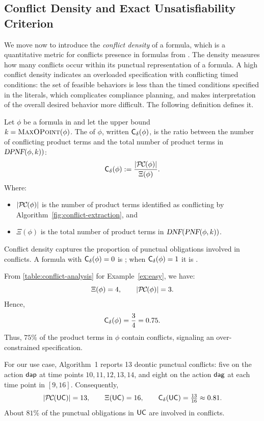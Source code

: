 \subsection{Conflict Density and Exact Unsatisfiability Criterion}
We move now to introduce the \emph{conflict density} of a formula, which is a quantitative metric for conflicts presence in formulas from \TDDLfm.  
The density measures how many conflicts occur within its punctual representation of a formula.  
A high conflict density indicates an overloaded specification with conflicting timed conditions: the set of feasible behaviors is less than the timed conditions specified in the literals, which complicates compliance planning, and makes interpretation of the overall desired behavior more difficult. The following definition defines it.

\begin{definition}\label{def:Conflict density-measure}
Let $\phi$ be a formula in \TDDLfm and let the upper bound\\ $k=\textsc{MaxOPoint}(\phi)$.  
The  of $\phi$, written $\mathsf{C_\delta} (\phi)$, is the ratio between the number of conflicting product terms and the total number of product terms in $\textsl{DPNF}(\phi,k))$:
\[
\cd(\phi) := \frac{\size{\mathcall{PC}(\phi)}}{\Xi(\phi)}.
\]
Where:
\begin{itemize}
    \item $\size{\mathcall{PC}(\phi)}$ is the number of product terms identified as conflicting by Algorithm~\ref{fig:conflict-extraction}, and
    \item $\Xi(\phi)$ is the total number of product terms in $\textsl{DNF}(\textsl{PNF}(\phi,k))$.
\end{itemize}
\end{definition}

Conflict density captures the proportion of punctual obligations involved in conflicts.  
A formula with $\mathsf{C_\delta} (\phi)=0$ is ; when $\mathsf{C_\delta} (\phi)=1$ it is .

\begin{example}
From \ref{table:conflict-analysis} for Example~\ref{ex:easy}, we have:
\[
\Xi(\phi)=4, \qquad \size{\mathcall{PC}(\phi)}=3.
\]
Hence,
\[
\mathsf{C_\delta} (\phi)=\frac{3}{4}=0.75.
\]
Thus, $75\%$ of the product terms in $\phi$ contain conflicts, signaling an over-constrained specification.
\end{example}

\begin{example}\label{ex:Conflict density-UC1-UC2}
For our use case, Algorithm~1 reports 13 deontic punctual conflicts: five on the action $\mathsf{dap}$ at time points $10,11,12,13,14$, and eight on the action $\mathsf{dag}$ at each time point in $[9,16]$. Consequently,
$$
\size{\mathcall{PC}(\UC)}=13, \qquad
\Xi(\UC)=16, \qquad
\cd(\UC)=\tfrac{13}{16}\approx 0.81.
$$
About $81\%$ of the punctual obligations in $\mathsf{UC}$ are involved in conflicts.

\end{example}

